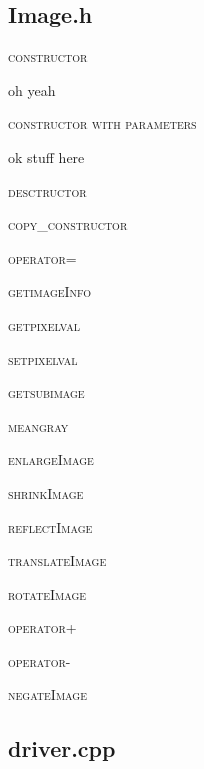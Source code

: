 \documentclass[pdftex, 11pt]{article}
\begin{document}
\subsection{Image.h}
\begin{description}

	\item{\textsc{constructor}}

		oh yeah

	\item{\textsc{constructor with parameters}}

		ok stuff here

	\item{\textsc{desctructor}}

	\item{\textsc{copy\_constructor}}

	\item{\textsc{operator=}}

	\item{\textsc{getimageInfo}}

	\item{\textsc{getpixelval}}

	\item{\textsc{setpixelval}}

	\item{\textsc{getsubimage}}

	\item{\textsc{meangray}}

	\item{\textsc{enlargeImage}}

	\item{\textsc{shrinkImage}}

	\item{\textsc{reflectImage}}

	\item{\textsc{translateImage}}

	\item{\textsc{rotateImage}}

	\item{\textsc{operator+}}

	\item{\textsc{operator-}}

	\item{\textsc{negateImage}}

\end{description}

\subsection{driver.cpp}
\end{document}
